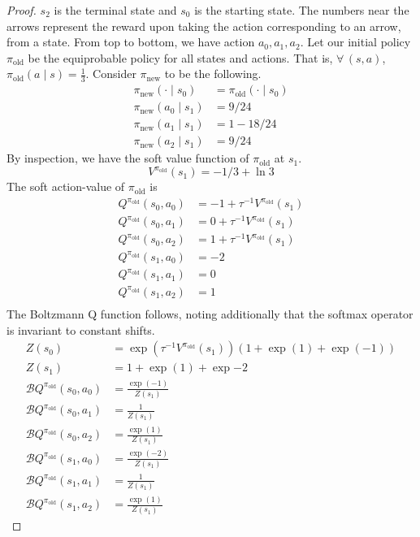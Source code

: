 \documentclass{article}
\newcommand{\boltzmannQ}{\mathcal{B}Q}
\newcommand{\piold}{{\pi_\mathrm{old}}}
\newcommand{\pinew}{{\pi_\mathrm{new}}}
\begin{document}
\begin{proof}
$s_2$ is the terminal state and $s_0$ is the starting state. The numbers near the arrows represent the reward upon taking the action corresponding to an arrow, from a state. From top to bottom, we have action $a_0, a_1, a_2$. Let our initial policy $\piold$ be the equiprobable policy for all states and actions. That is, $\forall\, (s, a)$, $\piold(a \mid s) = \frac{1}{3}$. Consider $\pinew$ to be the following. 
\begin{align*}
    \pinew(\cdot \mid s_0) &= \piold(\cdot \mid s_0)\\
    \pinew(a_0 \mid s_1) &= 9/24\\
    \pinew(a_1 \mid s_1) &= 1 - 18/24\\
    \pinew(a_2 \mid s_1) &= 9/24
\end{align*}
%
By inspection, we have the soft value function of $\piold$ at $s_1$.
\begin{equation}
    V^\piold(s_1) = -1/3  + \ln 3    
\end{equation}
The soft action-value of $\piold$ is 
\begin{align*}
    Q^\piold(s_0, a_0) &= -1 + \tau^{-1} V^\piold(s_1)\\
    Q^\piold(s_0, a_1) &= 0 + \tau^{-1} V^\piold(s_1)\\
    Q^\piold(s_0, a_2) &= 1 + \tau^{-1} V^\piold(s_1)\\
    Q^\piold(s_1, a_0) &= -2\\
    Q^\piold(s_1, a_1) &= 0 \\
    Q^\piold(s_1, a_2) &= 1 \\
\end{align*}
The Boltzmann Q function follows, noting additionally that the softmax operator is invariant to constant shifts. 
\begin{align*}
    Z(s_0) &= \exp(\tau^{-1} V^\piold(s_1))(1 + \exp(1) + \exp(-1)) \\
    Z(s_1) &= 1 + \exp(1) + \exp{-2}\\
    \boltzmannQ^\piold(s_0, a_0) &= \frac{\exp(-1)}{Z(s_1)}\\
    \boltzmannQ^\piold(s_0, a_1) &= \frac{1}{Z(s_1)}\\
    \boltzmannQ^\piold(s_0, a_2) &= \frac{\exp(1)}{Z(s_1)}\\
    \boltzmannQ^\piold(s_1, a_0) &= \frac{\exp(-2)}{Z(s_1)}\\
    \boltzmannQ^\piold(s_1, a_1) &= \frac{1}{Z(s_1)}\\
    \boltzmannQ^\piold(s_1, a_2) &= \frac{\exp(1)}{Z(s_1)}
\end{align*}

\end{proof}
\end{document}
